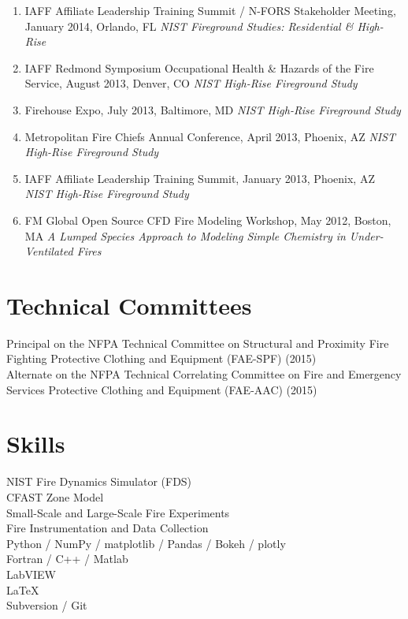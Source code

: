 \documentclass[10pt,letterpaper]{article}
\begin{document}
\begin{enumerate}
\item IAFF Affiliate Leadership Training Summit / N-FORS Stakeholder Meeting, January 2014, Orlando, FL {\em NIST Fireground Studies: Residential \& High-Rise}
\item IAFF Redmond Symposium Occupational Health \& Hazards of the Fire Service, August 2013, Denver, CO {\em NIST High-Rise Fireground Study}
\item Firehouse Expo, July 2013, Baltimore, MD {\em NIST High-Rise Fireground Study}
\item Metropolitan Fire Chiefs Annual Conference, April 2013, Phoenix, AZ {\em NIST High-Rise Fireground Study}
\item IAFF Affiliate Leadership Training Summit, January 2013, Phoenix, AZ {\em NIST High-Rise Fireground Study}
\item FM Global Open Source CFD Fire Modeling Workshop, May 2012, Boston, MA {\em A Lumped Species Approach to Modeling Simple Chemistry in Under-Ventilated Fires}
\end{enumerate}

\clearpage

\section*{Technical Committees}

Principal on the NFPA Technical Committee on Structural and Proximity Fire Fighting Protective Clothing and Equipment (FAE-SPF) (2015) \\
\vskip1pt
Alternate on the NFPA Technical Correlating Committee on Fire and Emergency Services Protective Clothing and Equipment (FAE-AAC) (2015) \\

\section*{Skills}
NIST Fire Dynamics Simulator (FDS) \\
CFAST Zone Model \\
Small-Scale and Large-Scale Fire Experiments \\
Fire Instrumentation and Data Collection \\
Python / NumPy / matplotlib / Pandas / Bokeh / plotly \\
Fortran / C++ / Matlab \\
LabVIEW \\
\LaTeX \\
Subversion / Git \\
\end{document}
